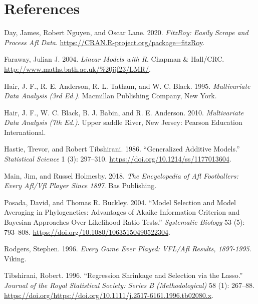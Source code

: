\documentclass{article}
\begin{document}
\pagebreak

\hypertarget{references}{%
\section*{References}\label{references}}

\hypertarget{refs}{}
\leavevmode\hypertarget{ref-fitzRoy}{}%
Day, James, Robert Nguyen, and Oscar Lane. 2020. \emph{FitzRoy: Easily
Scrape and Process Afl Data}.
\url{https://CRAN.R-project.org/package=fitzRoy}.

\leavevmode\hypertarget{ref-R:Faraway:2004}{}%
Faraway, Julian J. 2004. \emph{Linear Models with R}. Chapman \&
Hall/CRC. \url{http://www.maths.bath.ac.uk/\%20jjf23/LMR/}.

\leavevmode\hypertarget{ref-multi2}{}%
Hair, J. F., R. E. Anderson, R. L. Tatham, and W. C. Black. 1995.
\emph{Multivariate Data Analysis (3rd Ed.)}. Macmillan Publishing
Company, New York.

\leavevmode\hypertarget{ref-multi1}{}%
Hair, J. F., W. C. Black, B. J. Babin, and R. E. Anderson. 2010.
\emph{Multivariate Data Analysis (7th Ed.)}. Upper saddle River, New
Jersey: Pearson Education International.

\leavevmode\hypertarget{ref-10.1214ux2fssux2f1177013604}{}%
Hastie, Trevor, and Robert Tibshirani. 1986. ``Generalized Additive
Models.'' \emph{Statistical Science} 1 (3): 297--310.
\url{https://doi.org/10.1214/ss/1177013604}.

\leavevmode\hypertarget{ref-everyone}{}%
Main, Jim, and Russel Holmesby. 2018. \emph{The Encyclopedia of Afl
Footballers: Every Afl/Vfl Player Since 1897}. Bas Publishing.

\leavevmode\hypertarget{ref-10.1080ux2f10635150490522304}{}%
Posada, David, and Thomas R. Buckley. 2004. ``Model Selection and Model
Averaging in Phylogenetics: Advantages of Akaike Information Criterion
and Bayesian Approaches Over Likelihood Ratio Tests.'' \emph{Systematic
Biology} 53 (5): 793--808.
\url{https://doi.org/10.1080/10635150490522304}.

\leavevmode\hypertarget{ref-everygame}{}%
Rodgers, Stephen. 1996. \emph{Every Game Ever Played: VFL/Afl Results,
1897-1995}. Viking.

\leavevmode\hypertarget{ref-https:ux2fux2fdoi.orgux2f10.1111ux2fj.2517-6161.1996.tb02080.x}{}%
Tibshirani, Robert. 1996. ``Regression Shrinkage and Selection via the
Lasso.'' \emph{Journal of the Royal Statistical Society: Series B
(Methodological)} 58 (1): 267--88.
\url{https://doi.org/https://doi.org/10.1111/j.2517-6161.1996.tb02080.x}.
\end{document}
